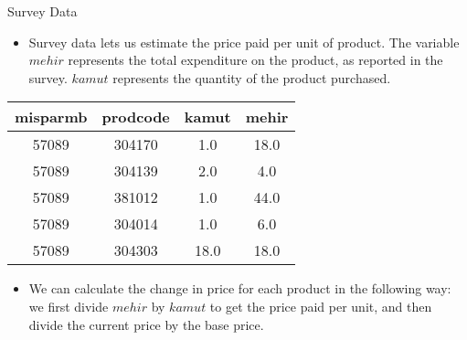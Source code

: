 \documentclass{beamer}
\begin{document}
\begin{frame}{Survey Data}
    \begin{itemize}
        \item Survey data lets us estimate the price paid per unit of product. The variable $mehir$ represents the total expenditure on the product, as reported in the survey. $kamut$ represents the quantity of the product purchased.
    \end{itemize}
    \begin{table}[h]
        \centering
        \begin{tabular}{c c c c}
            \hline
            \textbf{misparmb} & \textbf{prodcode} & \textbf{kamut} & \textbf{mehir} \\
            \hline
            57089             & 304170            & 1.0            & 18.0           \\
            57089             & 304139            & 2.0            & 4.0            \\
            57089             & 381012            & 1.0            & 44.0           \\
            57089             & 304014            & 1.0            & 6.0            \\
            57089             & 304303            & 18.0           & 18.0           \\
            \hline
        \end{tabular}
        \label{tab:survey_table}
    \end{table}
    \begin{itemize}
        \item We can calculate the change in price for each product in the following way: we first divide $mehir$ by $kamut$ to get the price paid per unit, and then divide the current price by the base price.
    \end{itemize}
\end{frame}
\end{document}
